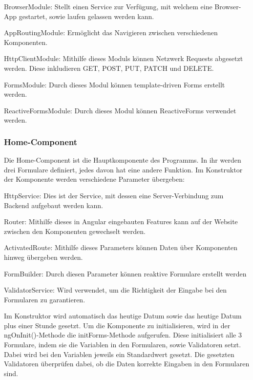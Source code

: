\begin{compactitem}
\item BrowserModule: Stellt einen Service zur Verfügung, mit welchem eine Browser-App gestartet, sowie laufen gelassen werden kann.
\item AppRoutingModule: Ermöglicht das Navigieren zwischen verschiedenen Komponenten.
\item HttpClientModule: Mithilfe dieses Moduls können Netzwerk Requests abgesetzt werden. Diese inkludieren GET, POST, PUT, PATCH und DELETE.
\item FormsModule: Durch dieses Modul können template-driven Forms erstellt werden.
\item ReactiveFormsModule: Durch dieses Modul können ReactiveForms verwendet werden.
\end{compactitem}


\subsubsection{Home-Component}
Die Home-Component ist die Hauptkomponente des Programms. In ihr werden drei Formulare definiert, jedes davon hat eine andere Funktion. Im Konstruktor der Komponente werden verschiedene Parameter übergeben:


\begin{compactitem}
\item HttpService: Dies ist der Service, mit dessen eine Server-Verbindung zum Backend aufgebaut werden kann.
\item Router: Mithilfe dieses in Angular eingebauten Features kann auf der Website zwischen den Komponenten gewechselt werden.
\item ActivatedRoute: Mithilfe dieses Parameters können Daten über Komponenten hinweg übergeben werden.
\item FormBuilder: Durch diesen Parameter können reaktive Formulare erstellt werden
\item ValidatorService: Wird verwendet, um die Richtigkeit der Eingabe bei den Formularen zu garantieren.
\end{compactitem}


Im Konstruktor wird automatisch das heutige Datum sowie das heutige Datum plus einer Stunde gesetzt.
Um die Komponente zu initialisieren, wird in der ngOnInit()-Methode die initForms-Methode aufgerufen. Diese initialisiert alle 3 Formulare, indem sie die Variablen in den Formularen, sowie Validatoren setzt. Dabei wird bei den Variablen jeweils ein Standardwert gesetzt. Die gesetzten Validatoren überprüfen dabei, ob die Daten korrekte Eingaben in den Formularen sind.


